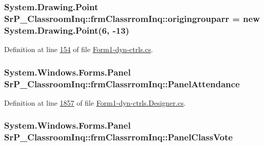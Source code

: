 \hypertarget{class_sr_p___classroom_inq_1_1frm_classrrom_inq_ace01ba3289e75624d67b90f742c195f5}{
\subsubsection[{origingrouparr}]{\setlength{\rightskip}{0pt plus 5cm}\-System.\-Drawing.\-Point {\bf \-Sr\-P\-\_\-\-Classroom\-Inq\-::frm\-Classrrom\-Inq\-::origingrouparr} = new \-System.\-Drawing.\-Point(6, -\/13)}}
\label{class_sr_p___classroom_inq_1_1frm_classrrom_inq_ace01ba3289e75624d67b90f742c195f5}


\-Definition at line \hyperlink{_form1-dyn-ctrls_8cs_source_l00154}{154} of file \hyperlink{_form1-dyn-ctrls_8cs_source}{\-Form1-\/dyn-\/ctrls.\-cs}.

\hypertarget{class_sr_p___classroom_inq_1_1frm_classrrom_inq_a45178e53b0fdc6749e2557f299ddddac}{
\subsubsection[{\-Panel\-Attendance}]{\setlength{\rightskip}{0pt plus 5cm}\-System.\-Windows.\-Forms.\-Panel {\bf \-Sr\-P\-\_\-\-Classroom\-Inq\-::frm\-Classrrom\-Inq\-::\-Panel\-Attendance}}}
\label{class_sr_p___classroom_inq_1_1frm_classrrom_inq_a45178e53b0fdc6749e2557f299ddddac}


\-Definition at line \hyperlink{_form1-dyn-ctrls_8_designer_8cs_source_l01857}{1857} of file \hyperlink{_form1-dyn-ctrls_8_designer_8cs_source}{\-Form1-\/dyn-\/ctrls.\-Designer.\-cs}.

\hypertarget{class_sr_p___classroom_inq_1_1frm_classrrom_inq_a1225290cf0284e727d8a2ce9aa2d2a33}{
\subsubsection[{\-Panel\-Class\-Vote}]{\setlength{\rightskip}{0pt plus 5cm}\-System.\-Windows.\-Forms.\-Panel {\bf \-Sr\-P\-\_\-\-Classroom\-Inq\-::frm\-Classrrom\-Inq\-::\-Panel\-Class\-Vote}}}
\label{class_sr_p___classroom_inq_1_1frm_classrrom_inq_a1225290cf0284e727d8a2ce9aa2d2a33}


